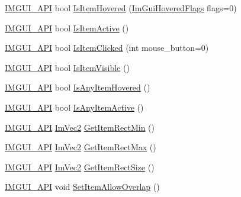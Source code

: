 \begin{DoxyCompactItemize}
\item 
\mbox{\hyperlink{imgui_8h_a43829975e84e45d1149597467a14bbf5}{I\+M\+G\+U\+I\+\_\+\+A\+PI}} bool \mbox{\hyperlink{namespace_im_gui_ac9a400eff3a9561d95e80486c52a660b}{Is\+Item\+Hovered}} (\mbox{\hyperlink{imgui_8h_a3a8f688665e5ea0bd9700e1251580a2c}{Im\+Gui\+Hovered\+Flags}} flags=0)
\item 
\mbox{\hyperlink{imgui_8h_a43829975e84e45d1149597467a14bbf5}{I\+M\+G\+U\+I\+\_\+\+A\+PI}} bool \mbox{\hyperlink{namespace_im_gui_a2d8ac4569456a8003e4dddd39caf771c}{Is\+Item\+Active}} ()
\item 
\mbox{\hyperlink{imgui_8h_a43829975e84e45d1149597467a14bbf5}{I\+M\+G\+U\+I\+\_\+\+A\+PI}} bool \mbox{\hyperlink{namespace_im_gui_a0b5780dbd580e28f5d31f39da80b0b01}{Is\+Item\+Clicked}} (int mouse\+\_\+button=0)
\item 
\mbox{\hyperlink{imgui_8h_a43829975e84e45d1149597467a14bbf5}{I\+M\+G\+U\+I\+\_\+\+A\+PI}} bool \mbox{\hyperlink{namespace_im_gui_a0e9273fc53bdf7ca39d59cdb657c3c2f}{Is\+Item\+Visible}} ()
\item 
\mbox{\hyperlink{imgui_8h_a43829975e84e45d1149597467a14bbf5}{I\+M\+G\+U\+I\+\_\+\+A\+PI}} bool \mbox{\hyperlink{namespace_im_gui_a0512146617bb55e24ebcfbe3ce6553d5}{Is\+Any\+Item\+Hovered}} ()
\item 
\mbox{\hyperlink{imgui_8h_a43829975e84e45d1149597467a14bbf5}{I\+M\+G\+U\+I\+\_\+\+A\+PI}} bool \mbox{\hyperlink{namespace_im_gui_acdc18199d50d26919312db5f9707b8dc}{Is\+Any\+Item\+Active}} ()
\item 
\mbox{\hyperlink{imgui_8h_a43829975e84e45d1149597467a14bbf5}{I\+M\+G\+U\+I\+\_\+\+A\+PI}} \mbox{\hyperlink{struct_im_vec2}{Im\+Vec2}} \mbox{\hyperlink{namespace_im_gui_a65b24b72ec0e8444c705cebf3e91f570}{Get\+Item\+Rect\+Min}} ()
\item 
\mbox{\hyperlink{imgui_8h_a43829975e84e45d1149597467a14bbf5}{I\+M\+G\+U\+I\+\_\+\+A\+PI}} \mbox{\hyperlink{struct_im_vec2}{Im\+Vec2}} \mbox{\hyperlink{namespace_im_gui_a3d260209b8dc25a2c942e8cfd1ed0e51}{Get\+Item\+Rect\+Max}} ()
\item 
\mbox{\hyperlink{imgui_8h_a43829975e84e45d1149597467a14bbf5}{I\+M\+G\+U\+I\+\_\+\+A\+PI}} \mbox{\hyperlink{struct_im_vec2}{Im\+Vec2}} \mbox{\hyperlink{namespace_im_gui_a3303d1c37041307e11fd46fc43b2274d}{Get\+Item\+Rect\+Size}} ()
\item 
\mbox{\hyperlink{imgui_8h_a43829975e84e45d1149597467a14bbf5}{I\+M\+G\+U\+I\+\_\+\+A\+PI}} void \mbox{\hyperlink{namespace_im_gui_a3291356b06ebe5f771d60b334a831d4b}{Set\+Item\+Allow\+Overlap}} ()

\end{DoxyCompactItemize}
